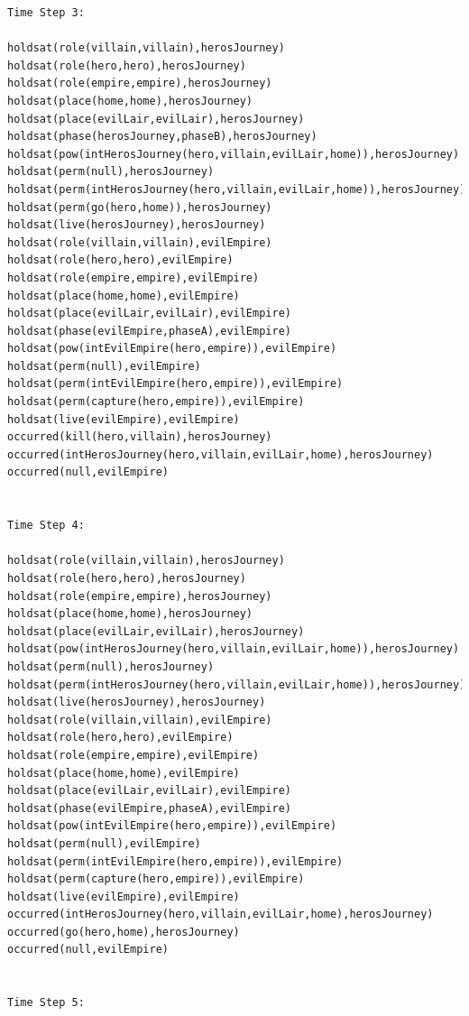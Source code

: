 \documentclass[11pt]{report}
\begin{document}
\begin{lstlisting}[label={lst:hero-evil-trace},caption={Example trace for both the ``Evil Empire'' and
``Hero's Journey'' tropes combined together}]
Time Step 3:

holdsat(role(villain,villain),herosJourney)
holdsat(role(hero,hero),herosJourney)
holdsat(role(empire,empire),herosJourney)
holdsat(place(home,home),herosJourney)
holdsat(place(evilLair,evilLair),herosJourney)
holdsat(phase(herosJourney,phaseB),herosJourney)
holdsat(pow(intHerosJourney(hero,villain,evilLair,home)),herosJourney)
holdsat(perm(null),herosJourney)
holdsat(perm(intHerosJourney(hero,villain,evilLair,home)),herosJourney)
holdsat(perm(go(hero,home)),herosJourney)
holdsat(live(herosJourney),herosJourney)
holdsat(role(villain,villain),evilEmpire)
holdsat(role(hero,hero),evilEmpire)
holdsat(role(empire,empire),evilEmpire)
holdsat(place(home,home),evilEmpire)
holdsat(place(evilLair,evilLair),evilEmpire)
holdsat(phase(evilEmpire,phaseA),evilEmpire)
holdsat(pow(intEvilEmpire(hero,empire)),evilEmpire)
holdsat(perm(null),evilEmpire)
holdsat(perm(intEvilEmpire(hero,empire)),evilEmpire)
holdsat(perm(capture(hero,empire)),evilEmpire)
holdsat(live(evilEmpire),evilEmpire)
occurred(kill(hero,villain),herosJourney)
occurred(intHerosJourney(hero,villain,evilLair,home),herosJourney)
occurred(null,evilEmpire)


Time Step 4:

holdsat(role(villain,villain),herosJourney)
holdsat(role(hero,hero),herosJourney)
holdsat(role(empire,empire),herosJourney)
holdsat(place(home,home),herosJourney)
holdsat(place(evilLair,evilLair),herosJourney)
holdsat(pow(intHerosJourney(hero,villain,evilLair,home)),herosJourney)
holdsat(perm(null),herosJourney)
holdsat(perm(intHerosJourney(hero,villain,evilLair,home)),herosJourney)
holdsat(live(herosJourney),herosJourney)
holdsat(role(villain,villain),evilEmpire)
holdsat(role(hero,hero),evilEmpire)
holdsat(role(empire,empire),evilEmpire)
holdsat(place(home,home),evilEmpire)
holdsat(place(evilLair,evilLair),evilEmpire)
holdsat(phase(evilEmpire,phaseA),evilEmpire)
holdsat(pow(intEvilEmpire(hero,empire)),evilEmpire)
holdsat(perm(null),evilEmpire)
holdsat(perm(intEvilEmpire(hero,empire)),evilEmpire)
holdsat(perm(capture(hero,empire)),evilEmpire)
holdsat(live(evilEmpire),evilEmpire)
occurred(intHerosJourney(hero,villain,evilLair,home),herosJourney)
occurred(go(hero,home),herosJourney)
occurred(null,evilEmpire)


Time Step 5:


\end{lstlisting}
\end{document}
